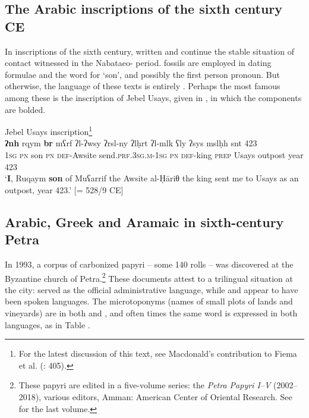 \documentclass[output=paper]{langsci/langscibook}
\begin{document}
\subsection{The Arabic inscriptions of the sixth century CE}
In  inscriptions of the sixth century, written  and  continue the stable situation of contact witnessed in the Nabataeo- period.  fossils are employed in dating formulae and the word for ‘son’, and possibly the first person pronoun. But otherwise, the language of these texts is entirely . Perhaps the most famous among these is the inscription of Jebel Usays, given in , in which the  components are bolded.

\ea\label{Usays} Jebel Usays inscription\footnote{For the latest discussion of this text, see Macdonald’s contribution to Fiema et al. (\citeyear{Fiemaetal2015}: 405).}\\
\gll   \textbf{ʔnh}\footnotemark{} rqym \textbf{br} mʕrf ʔl-ʔwsy ʔrsl-ny ʔlḥrt ʔl-mlk ʕly ʔsys mslḥh snt 423 \\
       \textsc{1sg} \textsc{pn} son \textsc{pn} \textsc{def}-Awsite send.\textsc{prf.3sg.m-1sg} \textsc{pn} \textsc{def}-king \textsc{prep} Usays outpost year 423  \\
\glt   `\textbf{I}, Ruqaym \textbf{son} of Muʕarrif the Awsite al-Ḥāriθ the king sent me to Usays as an outpost, year 423.' [= 528/9 CE]
\z


\subsection{Arabic, Greek and Aramaic in sixth-century Petra}
In 1993, a corpus of carbonized  papyri – some 140 rolls – was discovered at the Byzantine church of Petra.\footnote{These papyri are edited in a five-volume series: the \textit{Petra Papyri I--V} (2002--2018), various editors, Amman: American Center of Oriental
Research. See \citet{Arjavaetal2018} for the last volume.} These documents attest to a trilingual situation at the city:  served as the official administrative language, while  and  appear to have been spoken languages. The microtoponyms (names of small plots of lands and vineyards) are in both  and , and often times the same word is expressed in both languages, as in Table . 
\end{document}
